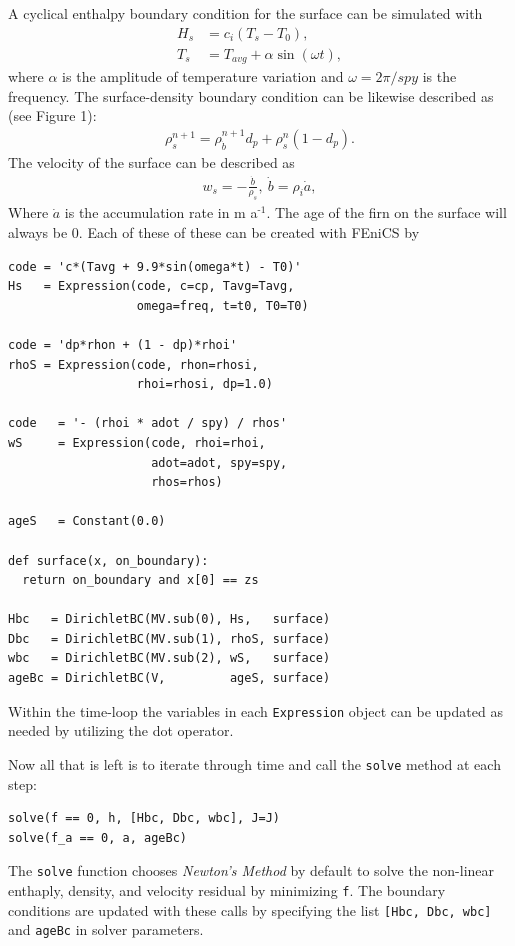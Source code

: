 \documentclass{article}%
\newcommand{\sups}[1]{\ensuremath{^{\textrm{#1}}}}
\begin{document}
A cyclical enthalpy boundary condition for the surface can be simulated with 
\begin{align*}
    H_s &= c_i ( T_s - T_0 ),\\
    T_s &= T_{avg} + \alpha \sin(\omega t),
\end{align*}
where $\alpha$ is the amplitude of temperature variation and $\omega = 2\pi / spy$ is the frequency.  The surface-density boundary condition can be likewise described as (see Figure 1): 
\begin{align*}
    \rho_s^{n+1} = \rho_{\dot{b}}^{n+1} d_p + \rho_s^{n} (1 - d_p).
\end{align*}
The velocity of the surface can be described as 
\begin{align*}
  w_s = -\frac{\dot{b}}{\rho_s},\ \dot{b} = \rho_i \dot{a},
\end{align*}
Where $\dot{a}$ is the accumulation rate in m a\sups{-1}.
The age of the firn on the surface will always be 0.
Each of these of these can be created with FEniCS by
\footnotesize
\begin{verbatim}
code = 'c*(Tavg + 9.9*sin(omega*t) - T0)'
Hs   = Expression(code, c=cp, Tavg=Tavg, 
                  omega=freq, t=t0, T0=T0)

code = 'dp*rhon + (1 - dp)*rhoi'
rhoS = Expression(code, rhon=rhosi, 
                  rhoi=rhosi, dp=1.0)

code   = '- (rhoi * adot / spy) / rhos'
wS     = Expression(code, rhoi=rhoi, 
                    adot=adot, spy=spy, 
                    rhos=rhos)

ageS   = Constant(0.0)

def surface(x, on_boundary):
  return on_boundary and x[0] == zs

Hbc   = DirichletBC(MV.sub(0), Hs,   surface)
Dbc   = DirichletBC(MV.sub(1), rhoS, surface)
wbc   = DirichletBC(MV.sub(2), wS,   surface)
ageBc = DirichletBC(V,         ageS, surface)
\end{verbatim}
\normalsize
Within the time-loop the variables in each \texttt{Expression} object can be updated as needed by utilizing the dot operator.

Now all that is left is to iterate through time and call the \texttt{solve} method at each step:\par
\footnotesize
\begin{verbatim}
solve(f == 0, h, [Hbc, Dbc, wbc], J=J)
solve(f_a == 0, a, ageBc)
\end{verbatim}
\normalsize
The \texttt{solve} function chooses \emph{Newton's Method} by default to solve the non-linear enthaply, density, and velocity residual by minimizing \texttt{f}.  The boundary conditions are updated with these calls by specifying the list \texttt{[Hbc, Dbc, wbc]} and \texttt{ageBc} in solver parameters.
\end{document}
